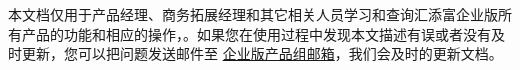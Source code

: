 \thispagestyle{empty}

本文档仅用于产品经理、商务拓展经理和其它相关人员学习和查询汇添富企业版所有产品的功能和相应的操作，{}。如果您在使用过程中发现本文描述有误或者没有及时更新，您可以把问题发送邮件至 \href{mailto:zhengyouxin@htffund.com}{企业版产品组邮箱}，我们会及时的更新文档。